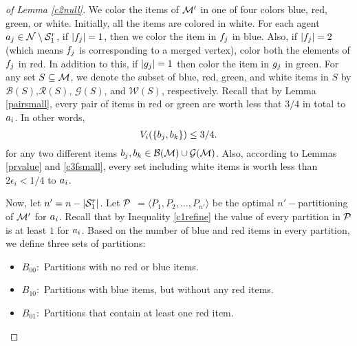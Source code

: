 \begin{proof}[of Lemma \ref{c2null}]
We color the items of $\mathcal{M}'$ in one of four colors blue, red, green, or white. Initially, all the items are colored in white. For each agent $a_j \in \mathcal{N} \setminus \mathcal{S}^r_1$, if $|f_j|=1$, then we color the item in $f_j$ in blue. Also, if $|f_j|=2$ (which means $f_j$ is corresponding to a merged vertex), color both the elements of $f_j$ in red. In addition to this, if $|g_j|=1$ then color the item in $g_j$ in green. For any set $S \subseteq \mathcal{M}$, we denote the subset of blue, red, green, and white items in $S$ by $\mathcal{B}(S)$,$\mathcal{R}(S)$, $\mathcal{G}(S)$, and $\mathcal{W}(S)$, respectively. Recall that by Lemma \ref{pairsmall}, every pair of items in red or green are worth less that $3/4$ in total to $a_i$. In other words,
\begin{equation*}
V_i(\{b_j, b_k\}) \leq 3/4.
\end{equation*}
for any two different items $b_j, b_k \in \mathcal{B}(\mathcal{M}) \cup \mathcal{G}(\mathcal{M})$.
  Also, according to Lemmas \ref{prvalue} and \ref{c3fsmall}, every set including white items is worth less than $2\epsilon_i < 1/4$ to $a_i$. 

Now, let $n' = n - |\mathcal{S}^r_1|$. Let $\cal P$ $= \langle P_1, P_2, \ldots, P_{n'} \rangle$ be the optimal $n'-$partitioning of $\mathcal{M}' $ for $a_i$. Recall that by Inequality \eqref{c1refine} the value of every partition in $\cal P$ is at least $1$ for $a_i$. Based on the number of blue and red items in every partition, we define three sets of partitions:
\begin{itemize}
    \item $B_{00}:$ Partitions with no red or blue items.
    \item $B_{10}:$ Partitions with blue items, but without any red items.
    \item $B_{01}:$ Partitions that contain at least one red item.
\end{itemize}


\end{proof}
